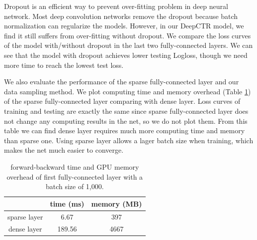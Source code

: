 \documentclass{sig-alternate}
\begin{document}
Dropout \cite{srivastava2014dropout} is an efficient way to prevent over-fitting problem in deep neural network. Most deep convolution networks remove the dropout because batch normalization can regularize the models. However, in our DeepCTR model, we find it still suffers from over-fitting without dropout. We compare the loss curves of the model with/without dropout in the last two fully-connected layers. We can see that the model with dropout achieves lower testing Logloss, though we need more time to reach the lowest test loss.


We also evaluate the performance of the sparse fully-connected layer and our data sampling method. We plot computing time and memory overhead (Table \ref{table:time&memory}) of the sparse fully-connected layer comparing with dense layer. Loss curves of training and testing are exactly the same since sparse fully-connected layer does not change any computing results in the net, so we do not plot them. From this table we can find dense layer  requires much more computing time and memory than sparse one. Using sparse layer allows a lager batch size when training, which makes the net much easier to converge. 

\begin{table}
	\centering
	\caption{forward-backward time and GPU memory overhead of first fully-connected layer with a batch size of 1,000.}
	\label{table:time&memory}
	\begin{tabular}{|c|c|c|} \hline
		& time (ms) & memory (MB)\\ \hline
		sparse layer & 6.67 &397 \\ \hline
		dense layer & 189.56 &4667 \\ \hline
	\end{tabular}
\end{table}
\end{document}
